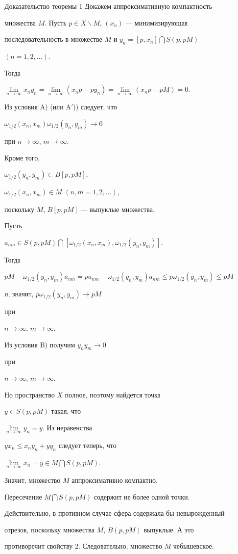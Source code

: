 \begin{pf*}{Доказательство теоремы 1} Докажем аппроксимативную компактность


множества $M$. Пусть $p \in X\backslash M$, $(x_{n})$ --- минимизирующая


последовательность в множестве $M$ и $y_{n} = [p,x_{n}]\bigcap S(p,pM)$


$(n = 1,2,\dotsc)$.


Тогда 


$\lim\limits_{n\to\infty}{x_{n}y_{n}}=\lim\limits_{n \to \infty}{(x_{n}p-


py_{n})} = \lim\limits_{n \to \infty}{(x_{n}p - pM)} = 0$. 


Из условия A) (или A$'$)) следует, что 


$\omega_{1/2}(x_{n},x_{m})\omega_{1/2}(y_{n},y_{m}) \to 0$


при $n \to \infty$, $m \to \infty$. 


Кроме того,


$\omega_{1/2}(y_{n},y_{m}) \subset B[p,pM]$,


$\omega_{1/2}(x_{n},x_{m}) \in M$ $(n, m = 1,2,\dotsc)$,


поскольку $M$, $B[p,pM]$ --- выпуклые множества. 





Пусть


$a_{nm}\in S(p,pM)\bigcap[\omega_{1/2}(x_{n},x_{m}),


\omega_{1/2}(y_{n},y_{m})]$.


Тогда 


$pM-\omega_{1/2}(y_{n},y_{m})a_{nm}=pa_{nm} -


\omega_{1/2}(y_{n},y_{m})a_{nm} \le p\omega_{1/2}(y_{n},y_{m}) \le pM$ 


и, значит, $p\omega_{1/2}(y_{n},y_{m}) \to pM$


при


$n \to \infty$, $m \to \infty$. 


Из условия B) получим $y_{n}y_{m} \to 0$


при


$n \to \infty$, $m \to \infty$.


Но пространство $X$ полное, поэтому найдется точка


$y \in S(p,pM)$ такая, что


$\lim\limits_{n \to \infty}{y_{n}} = y$. Из неравенства 


$yx_{n} \le x_{n}y_{n} + yy_{n}$ следует теперь, что


$\lim\limits_{n \to \infty}{x_{n}} = y \in M\bigcap S(p,pM)$. 


Значит, множество $M$ аппроксимативно компактно. 


Пересечение $M\bigcap S(p,pM)$ содержит не более одной точки.


Действительно, в противном случае сфера содержала бы невырожденный


отрезок, поскольку множества $M$, $B(p,pM)$ выпуклые. А это


противоречит свойству 2. Следовательно, множество $M$ чебышевское.


\end{pf*}
